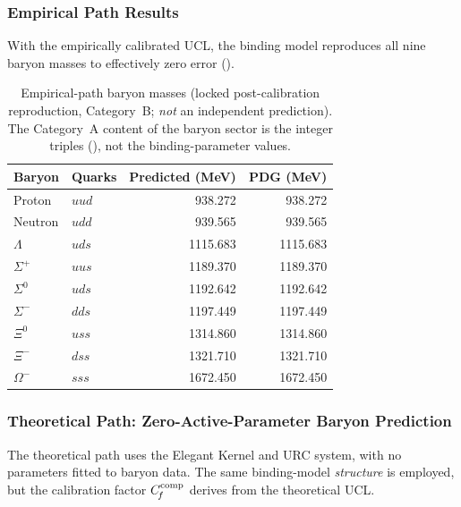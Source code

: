 \documentclass[11pt]{article}
\theoremstyle{remark}
\newcommand{\Cf}{C_{\!f}}
\begin{document}
\subsubsection{Empirical Path Results}

With the empirically calibrated UCL, the binding model reproduces all nine baryon masses to effectively zero error ().

\begin{table}[H]
\centering
\caption{Empirical-path baryon masses (locked post-calibration reproduction, Category~B; \emph{not} an independent prediction).  The Category~A content of the baryon sector is the integer triples (), not the binding-parameter values.}
\label{tab:baryons_empirical}
\renewcommand{\arraystretch}{1.05}
\small
\begin{tabular}{@{}l l r r@{}}
\toprule
\textbf{Baryon} & \textbf{Quarks} & \textbf{Predicted (MeV)} & \textbf{PDG (MeV)} \\
\midrule
Proton     & $uud$ & 938.272  & 938.272 \\
Neutron    & $udd$ & 939.565  & 939.565 \\
$\Lambda$  & $uds$ & 1115.683 & 1115.683 \\
$\Sigma^+$ & $uus$ & 1189.370 & 1189.370 \\
$\Sigma^0$ & $uds$ & 1192.642 & 1192.642 \\
$\Sigma^-$ & $dds$ & 1197.449 & 1197.449 \\
$\Xi^0$    & $uss$ & 1314.860 & 1314.860 \\
$\Xi^-$    & $dss$ & 1321.710 & 1321.710 \\
$\Omega^-$ & $sss$ & 1672.450 & 1672.450 \\
\bottomrule
\end{tabular}
\end{table}


\subsubsection{Theoretical Path: Zero-Active-Parameter Baryon Prediction}

The theoretical path uses the Elegant Kernel and URC system, with no parameters fitted to baryon data.
The same binding-model \emph{structure} is employed, but the calibration factor $\Cf^{\rm comp}$ derives from the theoretical UCL.
\end{document}
